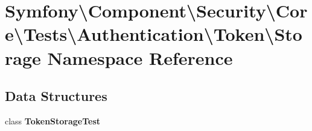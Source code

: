 \section{Symfony\textbackslash{}Component\textbackslash{}Security\textbackslash{}Core\textbackslash{}Tests\textbackslash{}Authentication\textbackslash{}Token\textbackslash{}Storage Namespace Reference}
\label{namespace_symfony_1_1_component_1_1_security_1_1_core_1_1_tests_1_1_authentication_1_1_token_1_1_storage}
\subsection*{Data Structures}
\begin{DoxyCompactItemize}
\item 
class {\bf Token\+Storage\+Test}
\end{DoxyCompactItemize}
